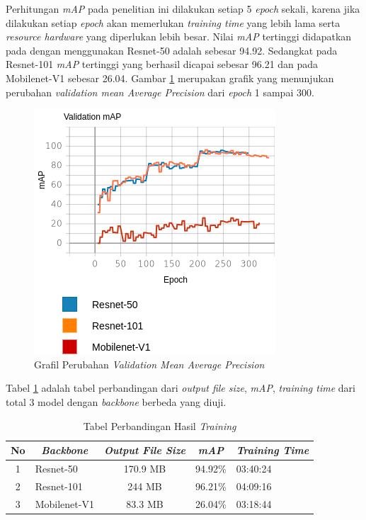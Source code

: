 \documentclass[conference]{IEEEtran}
\begin{document}
	Perhitungan \textit{mAP} pada penelitian ini dilakukan setiap 5 \textit{epoch} sekali, karena jika dilakukan setiap \textit{epoch} akan memerlukan \textit{training time} yang lebih lama serta \textit{resource hardware} yang diperlukan lebih besar. Nilai \textit{mAP} tertinggi didapatkan pada dengan menggunakan Resnet-50 adalah sebesar 94.92. Sedangkat pada Resnet-101 \textit{mAP} tertinggi yang berhasil dicapai sebesar 96.21 dan pada Mobilenet-V1 sebesar 26.04. Gambar \ref{map-result} merupakan grafik yang menunjukan perubahan \textit{validation mean Average Precision} dari \textit{epoch} 1 sampai 300.
	
	\begin{figure}[h]
		\centering
		\includegraphics[scale=0.4]{img/map-result.png}
		\caption{Grafil Perubahan \textit{Validation Mean Average Precision}}
		\label{map-result}
	\end{figure}

	Tabel \ref{tab:training-result} adalah tabel perbandingan dari \textit{output file size}, \textit{mAP}, \textit{training time} dari total 3 model dengan \textit{backbone} berbeda yang diuji. 
	
	\begin{table}[h]
		\caption{Tabel Perbandingan Hasil \textit{Training}}
		\begin{tabular}{|c|l|c|c|l|}
			\hline
			\textbf{No} & \multicolumn{1}{c|}{\textit{\textbf{Backbone}}} & \textit{\textbf{Output File Size}} & \textit{\textbf{mAP}} & \multicolumn{1}{c|}{\textit{\textbf{Training Time}}} \\ \hline
			1           & Resnet-50                                       & 170.9 MB                                   & 94.92\%                      & 03:40:24                              \\ \hline
			2           & Resnet-101                                      & 244 MB                                    & 96.21\%                      & 04:09:16                                \\ \hline
			3           & Mobilenet-V1                                    & 83.3 MB                                    & 26.04\%                      & 03:18:44                              \\ \hline
		\end{tabular}
		\label{tab:training-result}
	\end{table}
	
\end{document}
